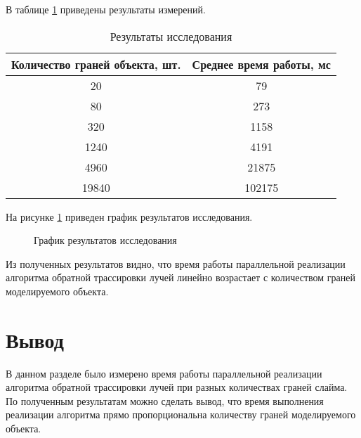 В таблице \ref{restable} приведены результаты измерений.

\begin{table}[H]
	\begin{center}
		\caption{\label{restable}Результаты исследования}
		\begin{tabular}{|c|c|}
			\hline
			\bf{Количество граней объекта, шт.} & \bf{Среднее время работы, мс}\\
			\hline
			20 & 79\\
			\hline
			80 & 273\\
			\hline
			320 & 1158\\
			\hline
			1240 & 4191\\
			\hline
			4960 & 21875\\
			\hline
			19840 & 102175\\
			\hline
		\end{tabular}
	\end{center}
\end{table}

На рисунке \ref{resgraph} приведен график результатов исследования.

\begin{figure}[H]
	\begin{center}
		\caption{\label{resgraph}График результатов исследования}
	\end{center}
\end{figure}

Из полученных результатов видно, что время работы параллельной реализации алгоритма обратной трассировки лучей линейно возрастает с количеством граней моделируемого объекта.

\section{Вывод}

В данном разделе было измерено время работы параллельной реализации алгоритма обратной трассировки лучей при разных количествах граней слайма. По полученным результатам можно сделать вывод, что время выполнения реализации алгоритма прямо пропорциональна количеству граней моделируемого объекта.

\clearpage
